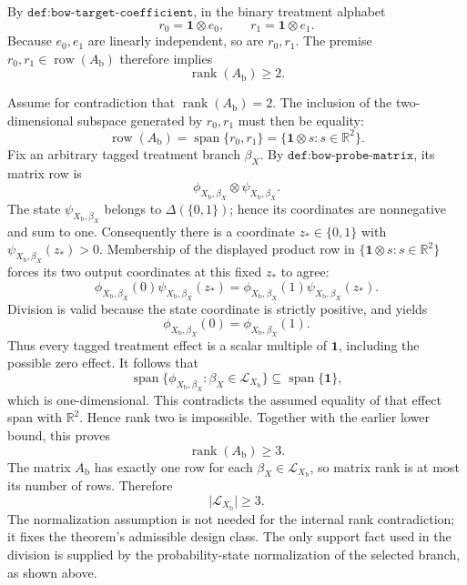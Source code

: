 By \(\texttt{def:bow-target-coefficient}\), in the binary treatment alphabet
\[
 r_0=\mathbf 1\otimes e_0,
 \qquad
 r_1=\mathbf 1\otimes e_1.
\]
Because \(e_0,e_1\) are linearly independent, so are \(r_0,r_1\).  The premise \(r_0,r_1\in\operatorname{row}(A_{\mathrm b})\) therefore implies
\[
 \operatorname{rank}(A_{\mathrm b})\ge2.
\]

Assume for contradiction that \(\operatorname{rank}(A_{\mathrm b})=2\).  The inclusion of the two-dimensional subspace generated by \(r_0,r_1\) must then be equality:
\[
 \operatorname{row}(A_{\mathrm b})
 =\operatorname{span}\{r_0,r_1\}
 =\{\mathbf 1\otimes s:s\in\mathbb R^2\}.
\]
Fix an arbitrary tagged treatment branch \(\beta_X\).  By \(\texttt{def:bow-probe-matrix}\), its matrix row is
\[
 \phi_{X_{\mathrm b},\beta_X}\otimes
 \psi_{X_{\mathrm b},\beta_X}.
\]
The state \(\psi_{X_{\mathrm b},\beta_X}\) belongs to \(\Delta(\{0,1\})\); hence its coordinates are nonnegative and sum to one.  Consequently there is a coordinate \(z_*\in\{0,1\}\) with \(\psi_{X_{\mathrm b},\beta_X}(z_*)>0\).  Membership of the displayed product row in \(\{\mathbf 1\otimes s:s\in\mathbb R^2\}\) forces its two output coordinates at this fixed \(z_*\) to agree:
\[
 \phi_{X_{\mathrm b},\beta_X}(0)\psi_{X_{\mathrm b},\beta_X}(z_*)
 =
 \phi_{X_{\mathrm b},\beta_X}(1)\psi_{X_{\mathrm b},\beta_X}(z_*).
\]
Division is valid because the state coordinate is strictly positive, and yields
\[
 \phi_{X_{\mathrm b},\beta_X}(0)
 =\phi_{X_{\mathrm b},\beta_X}(1).
\]
Thus every tagged treatment effect is a scalar multiple of \(\mathbf 1\), including the possible zero effect.  It follows that
\[
 \operatorname{span}\{\phi_{X_{\mathrm b},\beta_X}:\beta_X\in\mathcal L_{X_{\mathrm b}}\}
 \subseteq\operatorname{span}\{\mathbf 1\},
\]
which is one-dimensional.  This contradicts the assumed equality of that effect span with \(\mathbb R^2\).  Hence rank two is impossible.  Together with the earlier lower bound, this proves
\[
 \operatorname{rank}(A_{\mathrm b})\ge3.
\]
The matrix \(A_{\mathrm b}\) has exactly one row for each \(\beta_X\in\mathcal L_{X_{\mathrm b}}\), so matrix rank is at most its number of rows.  Therefore
\[
 \lvert\mathcal L_{X_{\mathrm b}}\rvert\ge3.
\]
The normalization assumption is not needed for the internal rank contradiction; it fixes the theorem's admissible design class.  The only support fact used in the division is supplied by the probability-state normalization of the selected branch, as shown above.